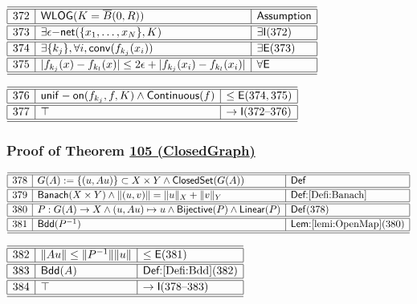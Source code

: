 \documentclass[11pt,reqno]{amsart}
\begin{document}
\noindent$%
\begin{array}{|r|l|l|}
\hline\hline
372 & \mathsf{WLOG}(K=\overline{B}(0,R)) & \textsf{Assumption} \\ \hline\hline
373 & \exists\epsilon\mathsf{-net}(\{x_{1},\dots,x_{N}\},K) & \exists\mathsf{I}(372) \\ \hline\hline
374 & \exists\{k_{j}\},\forall i,\mathsf{conv}(f_{k_{j}}(x_{i})) & \exists\mathsf{E}(373) \\ \hline\hline
375 & |f_{k_{j}}(x)-f_{k_{l}}(x)|\le2\epsilon+|f_{k_{j}}(x_{i})-f_{k_{l}}(x_{i})| & \forall\mathsf{E} \\ \hline\hline
\end{array}%
$

\medskip

\noindent$%
\begin{array}{|r|l|l|}
\hline\hline
376 & \mathsf{unif-on}(f_{k_{j}},f,K)\wedge\mathsf{Continuous}(f) & \le\mathsf{E}(374,375) \\ \hline\hline
377 & \top & \to\mathsf{I}(372\text{--}376) \\ \hline\hline
\end{array}%
$

\medskip

\subsubsection*{Proof of Theorem \hyperlink{thm:ClosedGraph}{105 (\textsf{ClosedGraph})}}

\noindent$%
\begin{array}{|r|l|l|}
\hline\hline
378 & G(A):=\{(u,Au)\}\subset X\times Y\wedge\mathsf{ClosedSet}(G(A)) & \mathsf{Def} \\ \hline\hline
379 & \mathsf{Banach}(X\times Y)\wedge\|(u,v)\|=\|u\|_{X}+\|v\|_{Y} & \textsf{Def:}\ref{Defi:Banach} \\ \hline\hline
380 & P:G(A)\to X\wedge(u,Au)\mapsto u\wedge\mathsf{Bijective}(P)\wedge\mathsf{Linear}(P) & \mathsf{Def}(378) \\ \hline\hline
381 & \mathsf{Bdd}(P^{-1}) & \textsf{Lem:}\ref{lemi:OpenMap}(380) \\ \hline\hline
\end{array}%
$

\medskip

\noindent$%
\begin{array}{|r|l|l|}
\hline\hline
382 & \|Au\|\le\|P^{-1}\|\|u\| & \le\mathsf{E}(381) \\ \hline\hline
383 & \mathsf{Bdd}(A) & \textsf{Def:}\ref{Defi:Bdd}(382) \\ \hline\hline
384 & \top & \to\mathsf{I}(378\text{--}383) \\ \hline\hline
\end{array}%
$
\end{document}
